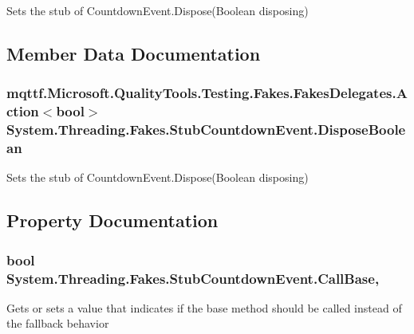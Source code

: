 Sets the stub of Countdown\-Event.\-Dispose(\-Boolean disposing)



\subsection{Member Data Documentation}
\hypertarget{class_system_1_1_threading_1_1_fakes_1_1_stub_countdown_event_a0fdfa99fbae231ca8852f3abfb81b781}{
\subsubsection[{Dispose\-Boolean}]{\setlength{\rightskip}{0pt plus 5cm}mqttf.\-Microsoft.\-Quality\-Tools.\-Testing.\-Fakes.\-Fakes\-Delegates.\-Action$<$bool$>$ System.\-Threading.\-Fakes.\-Stub\-Countdown\-Event.\-Dispose\-Boolean}}\label{class_system_1_1_threading_1_1_fakes_1_1_stub_countdown_event_a0fdfa99fbae231ca8852f3abfb81b781}


Sets the stub of Countdown\-Event.\-Dispose(\-Boolean disposing)



\subsection{Property Documentation}
\hypertarget{class_system_1_1_threading_1_1_fakes_1_1_stub_countdown_event_a6d2b8be2b4ff54e301cd2bd019a66d83}{
\subsubsection[{Call\-Base}]{\setlength{\rightskip}{0pt plus 5cm}bool System.\-Threading.\-Fakes.\-Stub\-Countdown\-Event.\-Call\-Base\hspace{0.3cm}{\ttfamily [get]}, {\ttfamily [set]}}}\label{class_system_1_1_threading_1_1_fakes_1_1_stub_countdown_event_a6d2b8be2b4ff54e301cd2bd019a66d83}


Gets or sets a value that indicates if the base method should be called instead of the fallback behavior

